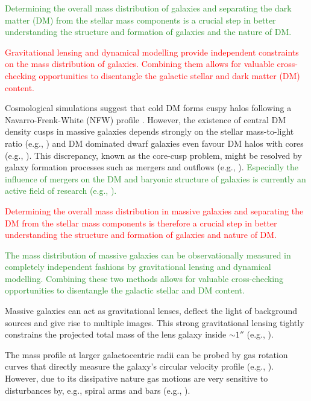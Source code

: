 \documentclass[useAMS,usenatbib]{mnras}
\newcommand{\NEW}[1]{\textcolor{ForestGreen}{#1}}
\newcommand{\OLD}[1]{\textcolor{Red}{#1}}
\begin{document}
\NEW{Determining the overall mass distribution of galaxies and separating the dark matter (DM) from the stellar mass components is a crucial step in better understanding the structure and formation of galaxies and the nature of DM.}

\OLD{Gravitational lensing and dynamical modelling provide independent constraints on the mass distribution of galaxies. Combining them allows for valuable cross-checking opportunities to disentangle the galactic stellar and dark matter (DM) content.}

Cosmological simulations suggest that cold DM forms cuspy halos following a Navarro-Frenk-White (NFW) profile \citep{1996ApJ...462..563N}. However, the existence of central DM density cusps in massive galaxies depends strongly on the stellar mass-to-light ratio (e.g., \citealt{2011MNRAS.416..322D}) and DM dominated dwarf galaxies even favour DM halos with cores (e.g., \citealt{1994Natur.370..629M,2001ApJ...552L..23D}). This discrepancy, known as the core-cusp problem, might be resolved by galaxy formation processes such as mergers and outflows (e.g., \citealt{2001ApJ...560..636E,2012MNRAS.421.3464P}). \NEW{Especially the influence of mergers on the DM and baryonic structure of galaxies is currently an active field of research (e.g., \citealt{2009ApJ...697L..38J,2010ApJ...712...88L,2012MNRAS.425.3119H,2015MNRAS.453.2447D}).}

\OLD{Determining the overall mass distribution in massive galaxies and separating the DM from the stellar mass components is therefore a crucial step in better understanding the structure and formation of galaxies and nature of DM.}

\NEW{The mass distribution of massive galaxies can be observationally measured in completely independent fashions by gravitational lensing and dynamical modelling. Combining these two methods allows for valuable cross-checking opportunities to disentangle the galactic stellar and DM content.}

Massive galaxies can act as gravitational lenses, deflect the light of background sources and give rise to multiple images. This strong gravitational lensing tightly constrains the projected total mass of the lens galaxy inside $\sim 1''$ (e.g., \citealt{2010ARA&A..48...87T}). 

The mass profile at larger galactocentric radii can be probed by gas rotation curves that directly measure the galaxy's circular velocity profile (e.g., \citealt{1980ApJ...238..471R}). However, due to its dissipative nature gas motions are very sensitive to disturbances by, e.g., spiral arms and bars (e.g., \citealt{2004dad..book.....S}). 
\end{document}
